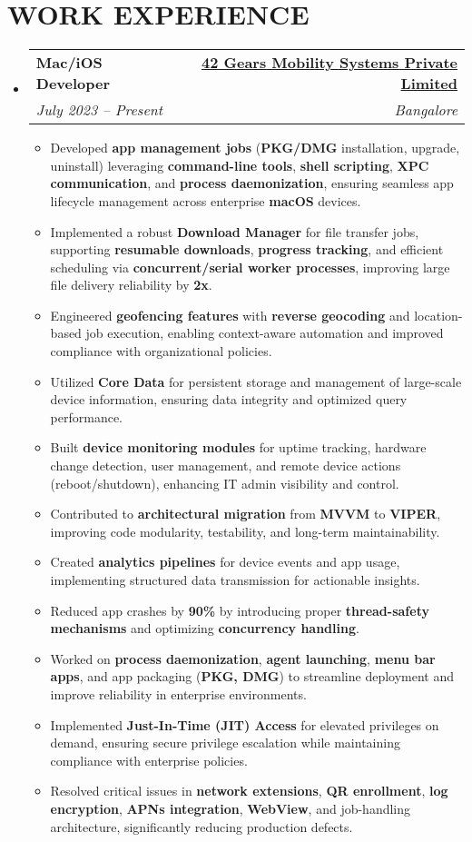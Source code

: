 \documentclass[letterpaper,11pt]{article}
\makeatletter
\newcommand{\resumeItem}[1]{
  \item\small{
    {#1 \vspace{-2pt}}
  }
}
\newcommand{\resumeSubheading}[4]{
  \vspace{-2pt}\item
    \begin{tabular*}{1.0\textwidth}[t]{l@{\extracolsep{\fill}}r}
      \textbf{\large#1} & \textbf{\small #2} \\
      \textit{\large#3} & \textit{\small #4} \\
      
    \end{tabular*}\vspace{-7pt}
}
\newcommand{\resumeSubHeadingListStart}{\begin{itemize}[leftmargin=0.0in, label={}]}
\newcommand{\resumeSubHeadingListEnd}{\end{itemize}}
\newcommand{\resumeItemListStart}{\begin{itemize}}
\newcommand{\resumeItemListEnd}{\end{itemize}\vspace{-5pt}}
\makeatother
\begin{document}
\section{WORK EXPERIENCE}
    \resumeSubHeadingListStart
        \resumeSubheading{Mac/iOS Developer}{\href{https://www.42gears.com/}{42 Gears Mobility Systems Private Limited}}{July 2023 -- Present}{Bangalore}
        \vspace{2pt}
            \resumeItemListStart
                \resumeItem{\normalsize{Developed \textbf{app management jobs} (\textbf{PKG/DMG} installation, upgrade, uninstall) leveraging \textbf{command-line tools}, \textbf{shell scripting}, \textbf{XPC communication}, and \textbf{process daemonization}, ensuring seamless app lifecycle management across enterprise \textbf{macOS} devices.}}
                \resumeItem{\normalsize{Implemented a robust \textbf{Download Manager} for file transfer jobs, supporting \textbf{resumable downloads}, \textbf{progress tracking}, and efficient scheduling via \textbf{concurrent/serial worker processes}, improving large file delivery reliability by \textbf{2x}.}}
                \resumeItem{\normalsize{Engineered \textbf{geofencing features} with \textbf{reverse geocoding} and location-based job execution, enabling context-aware automation and improved compliance with organizational policies.}}
                \resumeItem{\normalsize{Utilized \textbf{Core Data} for persistent storage and management of large-scale device information, ensuring data integrity and optimized query performance.}}
                \resumeItem{\normalsize{Built \textbf{device monitoring modules} for uptime tracking, hardware change detection, user management, and remote device actions (reboot/shutdown), enhancing IT admin visibility and control.}}
                \resumeItem{\normalsize{Contributed to \textbf{architectural migration} from \textbf{MVVM} to \textbf{VIPER}, improving code modularity, testability, and long-term maintainability.}}
                \resumeItem{\normalsize{Created \textbf{analytics pipelines} for device events and app usage, implementing structured data transmission for actionable insights.}}
                \resumeItem{\normalsize{Reduced app crashes by \textbf{90\%} by introducing proper \textbf{thread-safety mechanisms} and optimizing \textbf{concurrency handling}.}}
                \resumeItem{\normalsize{Worked on \textbf{process daemonization}, \textbf{agent launching}, \textbf{menu bar apps}, and app packaging (\textbf{PKG, DMG}) to streamline deployment and improve reliability in enterprise environments.}}
                \resumeItem{\normalsize{Implemented \textbf{Just-In-Time (JIT) Access} for elevated privileges on demand, ensuring secure privilege escalation while maintaining compliance with enterprise policies.}}
                \resumeItem{\normalsize{Resolved critical issues in \textbf{network extensions}, \textbf{QR enrollment}, \textbf{log encryption}, \textbf{APNs integration}, \textbf{WebView}, and job-handling architecture, significantly reducing production defects.}}
            \resumeItemListEnd
    \resumeSubHeadingListEnd
\end{document}
